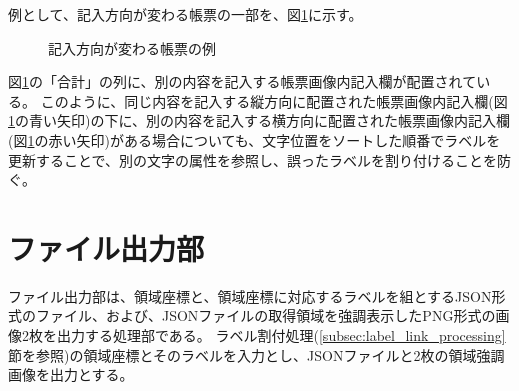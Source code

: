 例として、記入方向が変わる帳票の一部を、図\ref{fig:label_order}に示す。
\begin{figure}[tp]
    \begin{center}
        \caption{記入方向が変わる帳票の例}
        \label{fig:label_order}
    \end{center}
\end{figure}
図\ref{fig:label_order}の「合計」の列に、別の内容を記入する帳票画像内記入欄が配置されている。
このように、同じ内容を記入する縦方向に配置された帳票画像内記入欄(図\ref{fig:label_order}の青い矢印)の下に、別の内容を記入する横方向に配置された帳票画像内記入欄(図\ref{fig:label_order}の赤い矢印)がある場合についても、文字位置をソートした順番でラベルを更新することで、別の文字の属性を参照し、誤ったラベルを割り付けることを防ぐ。

\section{ファイル出力部}\label{subsec:file_output_part}
ファイル出力部は、領域座標と、領域座標に対応するラベルを組とするJSON形式のファイル、および、JSONファイルの取得領域を強調表示したPNG形式の画像2枚を出力する処理部である。
ラベル割付処理(\ref{subsec:label_link_processing}節を参照)の領域座標とそのラベルを入力とし、JSONファイルと2枚の領域強調画像を出力とする。

